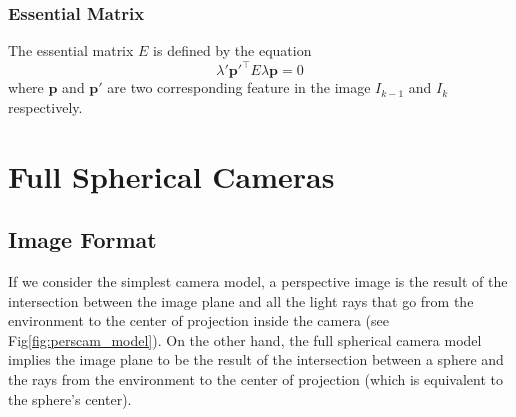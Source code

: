 \subsubsection{Essential Matrix}
\label{subsec:essential_matrix}
The essential matrix $E$ is defined by the equation
\begin{equation}
\lambda'\mathbf{p}'^\top E\lambda\mathbf{p} = 0
\end{equation}
\noindent where $\mathbf{p}$ and $\mathbf{p}'$ are two corresponding feature 
in the image $I_{k-1}$ and $I_{k}$ respectively. 

\section{Full Spherical Cameras}
\subsection{Image Format}
If we consider the simplest camera model, 
a perspective image is the result of the intersection between the image plane 
and all the light rays that go from the environment to the center of 
projection inside the camera (see Fig\ref{fig:perscam_model}).
\label{fig:perscam_model}
On the other hand, the full spherical camera model implies the image plane 
to be the result of the intersection between a sphere and the rays from the 
environment to the center of projection (which is equivalent to the sphere's 
center).

